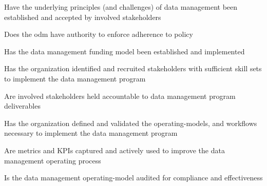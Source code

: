 \begin{core-questions}

  \item [\thesection.1] Have the underlying principles (and challenges) of data management been established and
                        accepted by involved stakeholders
  \item [\thesection.2] Does the \gls{odm} have authority to enforce adherence to policy
  \item [\thesection.3] Has the data management funding model been established and implemented
  \item [\thesection.4] Has the organization identified and recruited stakeholders with sufficient skill sets to
                        implement the data management program
  \item [\thesection.5] Are involved stakeholders held accountable to data management program deliverables
  \item [\thesection.6] Has the organization defined and validated the \glspl{operating-model},
                        and workflows necessary to implement the data management program
  \item [\thesection.7] Are metrics and KPIs captured and actively used to improve the data management operating process
  \item [\thesection.8] Is the data management \gls{operating-model} audited for compliance and effectiveness

\end{core-questions}

